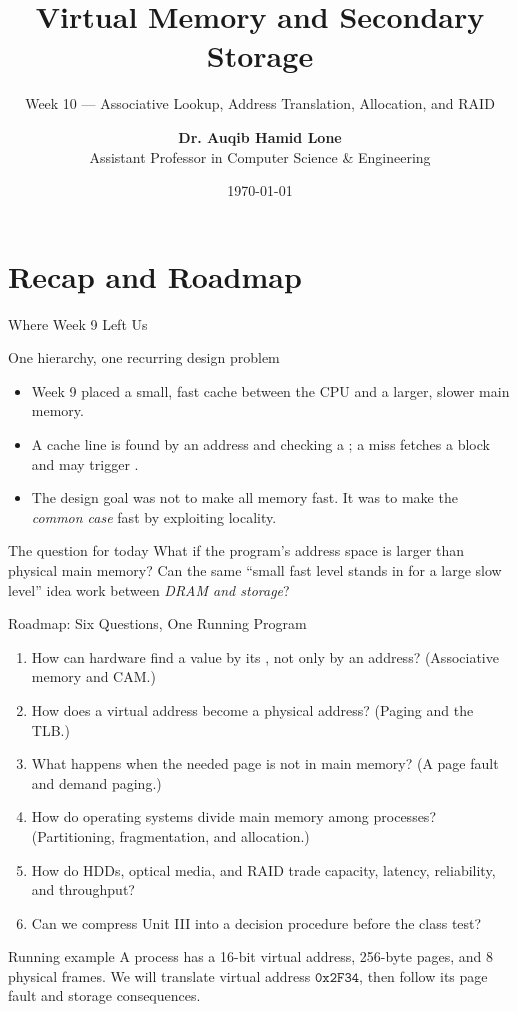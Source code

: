 \documentclass[aspectratio=169]{beamer}
\title{Virtual Memory and Secondary Storage}
\subtitle{Week 10 --- Associative Lookup, Address Translation, Allocation, and RAID}
\author[Dr. Auqib Hamid Lone]{%
  \textbf{Dr. Auqib Hamid Lone}\\
  \small Assistant Professor in Computer Science \& Engineering
}
\institute[GCET Ganderbal]{%
  \small\textbf{PCC CS-401: Computer Organization and Architecture}\\[0.3em]
  Department of Computer Science \& Engineering\\
  Government College of Engineering \& Technology (GCET), Ganderbal
}
\date[\today]{\small\today}
\begin{document}
\frame{\titlepage}

\section{Recap and Roadmap}

\begin{frame}{Where Week 9 Left Us}
  \begin{block}{One hierarchy, one recurring design problem}
    \begin{itemize}
      \item Week 9 placed a small, fast cache between the CPU and a larger,
        slower main memory.
      \item A cache line is found by  an address and checking a
        ; a miss fetches a block and may trigger .
      \item The design goal was not to make all memory fast. It was to make
        the \emph{common case} fast by exploiting locality.
    \end{itemize}
  \end{block}
  \begin{exampleblock}{The question for today}
    What if the program's address space is larger than physical main memory?
    Can the same ``small fast level stands in for a large slow level'' idea
    work between \emph{DRAM and storage}?
  \end{exampleblock}
\end{frame}

\begin{frame}{Roadmap: Six Questions, One Running Program}
  \begin{enumerate}
    \item How can hardware find a value by its , not only by an
      address? (Associative memory and CAM.)
    \item How does a virtual address become a physical address? (Paging and
      the TLB.)
    \item What happens when the needed page is not in main memory? (A page
      fault and demand paging.)
    \item How do operating systems divide main memory among processes?
      (Partitioning, fragmentation, and allocation.)
    \item How do HDDs, optical media, and RAID trade capacity, latency,
      reliability, and throughput?
    \item Can we compress Unit III into a decision procedure before the class
      test?
  \end{enumerate}
  \vspace{0.15cm}
  \begin{alertblock}{Running example}
    A process has a 16-bit virtual address, 256-byte pages, and 8 physical
    frames. We will translate virtual address $\texttt{0x2F34}$, then follow
    its page fault and storage consequences.
  \end{alertblock}
\end{frame}
\end{document}
